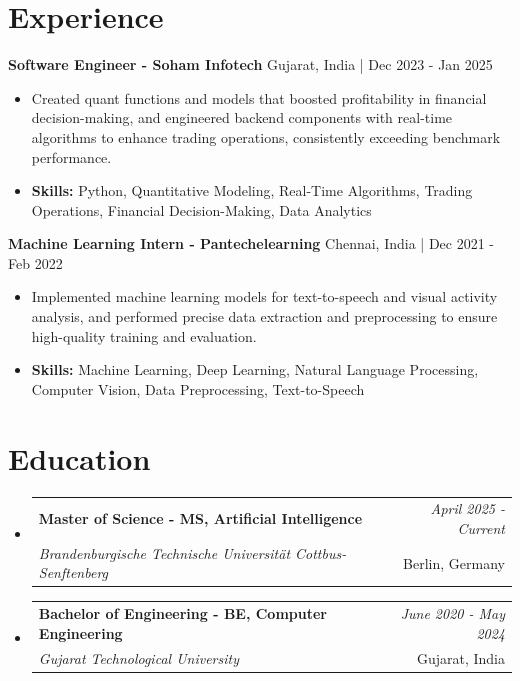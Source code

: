\documentclass[a4paper,11pt]{article}
\makeatletter
\newcommand{\resumeSubheading}[4]{
\vspace{0.5mm}\item
    \begin{tabular*}{\linewidth}[t]{l@{\extracolsep{\fill}}r}
        \textbf{#1} & \textit{\footnotesize{#4}} \\
        \textit{\footnotesize{#3}} &  \footnotesize{#2}\\
    \end{tabular*}
    \vspace{-2.4mm}
}
\makeatother
\begin{document}
\section{\textbf{Experience}}


\vspace{1mm}
  \textbf{Software Engineer - Soham Infotech} \hfill Gujarat, India | Dec 2023 - Jan 2025
\vspace{-1.5mm} %
\begin{itemize}
  \item Created quant functions and models that boosted profitability in financial decision-making, and engineered backend components with real-time algorithms to enhance trading operations, consistently exceeding benchmark performance.

\vspace{-2mm}
  \item \textbf{Skills:} Python, Quantitative Modeling, Real-Time Algorithms, Trading Operations, Financial Decision-Making, Data Analytics
\end{itemize}

\vspace{1mm}
  \textbf{Machine Learning Intern - Pantechelearning} \hfill Chennai, India | Dec 2021 - Feb 2022
\vspace{-1.5mm} %
\begin{itemize}
  \item Implemented machine learning models for text-to-speech and visual activity analysis, and performed precise data extraction and preprocessing to ensure high-quality training and evaluation.
\vspace{-2mm}
  \item \textbf{Skills:} Machine Learning, Deep Learning, Natural Language Processing, Computer Vision, Data Preprocessing, Text-to-Speech
\end{itemize}\section{\textbf{Education}}
\vspace{-0.4mm}

\begin{itemize}[leftmargin=0.15in, label={}]
\resumeSubheading
{Master of Science - MS, Artificial Intelligence }{Berlin, Germany}
{Brandenburgische Technische Universität Cottbus-Senftenberg  }{April 2025 - Current}

\vspace{1.0mm} %
\resumeSubheading
{Bachelor of Engineering - BE, Computer Engineering  }{Gujarat, India}
{Gujarat Technological University }{June 2020 - May 2024}

\end{itemize}
\end{document}
